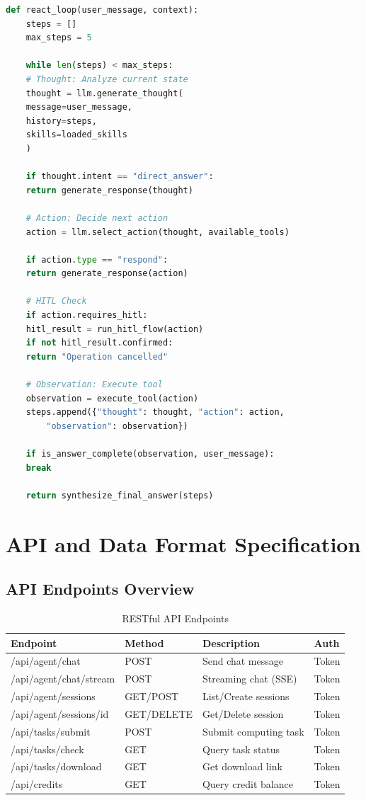 \begin{lstlisting}[language=Python, caption=ReAct Loop Pseudocode, basicstyle=\ttfamily\scriptsize]
	def react_loop(user_message, context):
	steps = []
	max_steps = 5
	
	while len(steps) < max_steps:
	# Thought: Analyze current state
	thought = llm.generate_thought(
	message=user_message,
	history=steps,
	skills=loaded_skills
	)
	
	if thought.intent == "direct_answer":
	return generate_response(thought)
	
	# Action: Decide next action
	action = llm.select_action(thought, available_tools)
	
	if action.type == "respond":
	return generate_response(action)
	
	# HITL Check
	if action.requires_hitl:
	hitl_result = run_hitl_flow(action)
	if not hitl_result.confirmed:
	return "Operation cancelled"
	
	# Observation: Execute tool
	observation = execute_tool(action)
	steps.append({"thought": thought, "action": action, 
		"observation": observation})
	
	if is_answer_complete(observation, user_message):
	break
	
	return synthesize_final_answer(steps)
\end{lstlisting}

\section{API and Data Format Specification}
\label{sec:chap4-api}

\subsection{API Endpoints Overview}

\begin{table}[H]
	\centering
	\caption{RESTful API Endpoints}
	\begin{tabular}{@{}llll@{}}
		\toprule
		\textbf{Endpoint} & \textbf{Method} & \textbf{Description} & \textbf{Auth} \\
		\midrule
		/api/agent/chat & POST & Send chat message & Token \\
		/api/agent/chat/stream & POST & Streaming chat (SSE) & Token \\
		/api/agent/sessions & GET/POST & List/Create sessions & Token \\
		/api/agent/sessions/{id} & GET/DELETE & Get/Delete session & Token \\
		/api/tasks/submit & POST & Submit computing task & Token \\
		/api/tasks/check & GET & Query task status & Token \\
		/api/tasks/download & GET & Get download link & Token \\
		/api/credits & GET & Query credit balance & Token \\
		\bottomrule
	\end{tabular}
\end{table}

